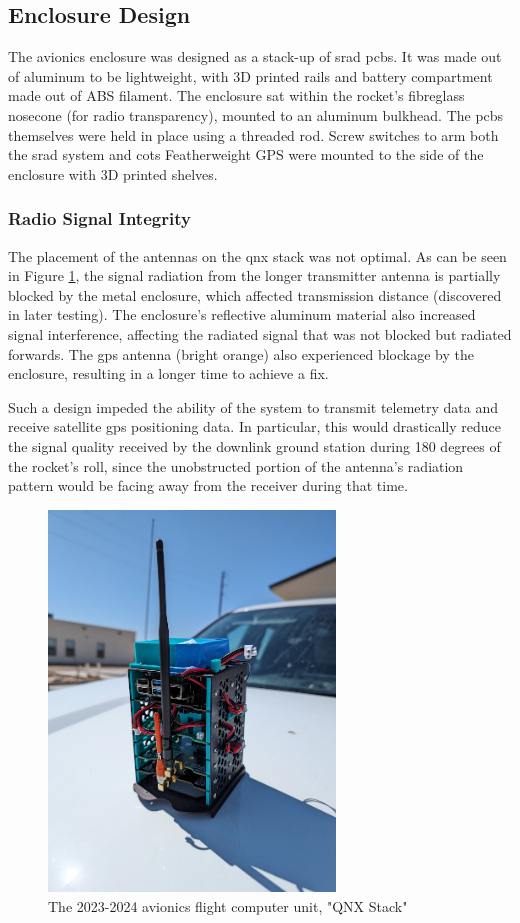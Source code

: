 \subsection{Enclosure Design}

The avionics enclosure was designed as a stack-up of \gls{srad} \glspl{pcb}. It was made out of aluminum to be
lightweight, with 3D printed rails and battery compartment made out of ABS filament. The enclosure sat within the
rocket's fibreglass nosecone (for radio transparency), mounted to an aluminum bulkhead. The \glspl{pcb} themselves were
held in place using a threaded rod. Screw switches to arm both the \gls{srad} system and \gls{cots} Featherweight GPS
were mounted to the side of the enclosure with 3D printed shelves.

\subsubsection{Radio Signal Integrity}

The placement of the antennas on the \gls{qnx} stack was not optimal. As can be seen in Figure
\ref{fig:preflight-stack}, the signal radiation from the longer transmitter antenna is partially blocked by the metal
enclosure, which affected transmission distance (discovered in later testing). The enclosure's reflective aluminum
material also increased signal interference, affecting the radiated signal that was not blocked but radiated forwards.
The \gls{gps} antenna (bright orange) also experienced blockage by the enclosure, resulting in a longer time to achieve
a fix.

Such a design impeded the ability of the system to transmit telemetry data and receive satellite \gls{gps} positioning
data. In particular, this would drastically reduce the signal quality received by the downlink ground station during
180 degrees of the rocket's roll, since the unobstructed portion of the antenna's radiation pattern would be facing
away from the receiver during that time.

\begin{figure}[H]
    \center
    \includegraphics[width=3in]{assets/images/stack.jpg}
    \caption{The 2023-2024 avionics flight computer unit, "QNX Stack"}
    \label{fig:preflight-stack}
\end{figure}


